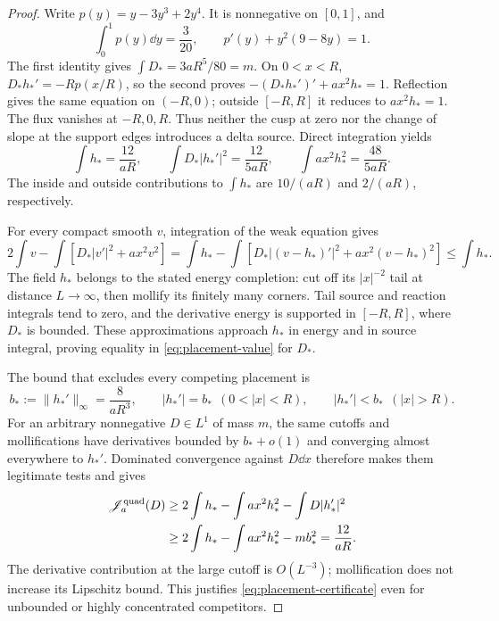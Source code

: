 \begin{proof}
Write $p(y)=y-3y^3+2y^4$. It is nonnegative on $[0,1]$, and
\begin{equation}\label{eq:placement-identities}
 \int_0^1p(y)\dd y=\frac3{20},\qquad
 p'(y)+y^2(9-8y)=1.
\end{equation}
The first identity gives $\int D_*=3aR^5/80=m$. On $0<x<R$,
$D_*h_*'=-Rp(x/R)$, so the second proves
$-(D_*h_*')'+ax^2h_*=1$. Reflection gives the same equation on
$(-R,0)$; outside $[-R,R]$ it reduces to $ax^2h_*=1$.
The flux vanishes at $-R,0,R$. Thus neither the cusp at zero nor the
change of slope at the support edges introduces a delta source.
Direct integration yields
\begin{equation}\label{eq:placement-energies}
 \int h_* =\frac{12}{aR},\qquad
 \int D_*|h_*'|^2=\frac{12}{5aR},\qquad
 \int ax^2h_*^2=\frac{48}{5aR}.
\end{equation}
The inside and outside contributions to $\int h_*$ are $10/(aR)$
and $2/(aR)$, respectively.

For every compact smooth $v$, integration of the weak equation gives
\[
 2\int v-\int[D_*|v'|^2+ax^2v^2]
 =\int h_*-\int[D_*|(v-h_*)'|^2+ax^2(v-h_*)^2]
 \le\int h_*.
\]
The field $h_*$ belongs to the stated energy completion: cut off its
$|x|^{-2}$ tail at distance $L\to\infty$, then mollify its finitely
many corners. Tail source and reaction integrals tend to zero, and
the derivative energy is supported in $[-R,R]$, where $D_*$ is bounded.
These approximations approach $h_*$ in energy and in source integral,
proving equality in \eqref{eq:placement-value} for $D_*$.

The bound that excludes every competing placement is
\begin{equation}\label{eq:placement-slope}
 b_*:=\|h_*'\|_\infty=\frac8{aR^3},\qquad
 |h_*'|=b_*\ \ (0<|x|<R),\qquad
 |h_*'|<b_*\ \ (|x|>R).
\end{equation}
For an arbitrary nonnegative $D\in L^1$ of mass $m$, the same
cutoffs and mollifications have derivatives bounded by $b_*+o(1)$
and converging almost everywhere to $h_*'$. Dominated convergence
against $D\dd x$ therefore makes them legitimate tests and gives
\begin{align}
 \mathscr J_a^{\rm quad}(D)
 &\ge2\int h_*-\int ax^2h_*^2-\int D|h_*'|^2\notag\\
 &\ge2\int h_*-\int ax^2h_*^2-mb_*^2
 =\frac{12}{aR}.
 \label{eq:placement-certificate}
\end{align}
The derivative contribution at the large cutoff is $O(L^{-3})$;
mollification does not increase its Lipschitz bound. This justifies
\eqref{eq:placement-certificate} even for unbounded or highly
concentrated competitors.


\end{proof}
